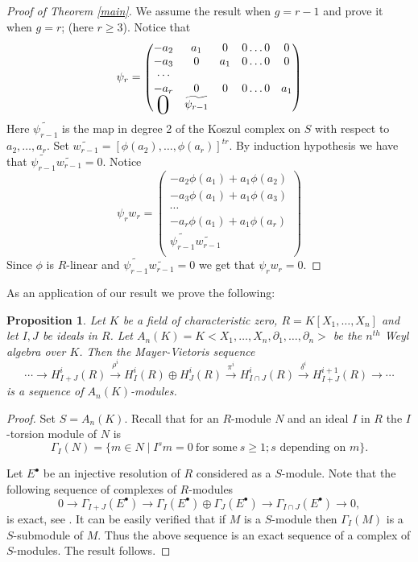 \documentclass{amsart}
\theoremstyle{plain}
\newtheorem{proposition}[theorem]{Proposition}
\theoremstyle{definition}
\theoremstyle{remark}
\numberwithin{equation}{theorem}
\begin{document}
\begin{proof}[Proof of Theorem \ref{main}]
We assume the result when $g = r-1$ and prove it when $g = r$; (here $r \geq 3$).
Notice that
\[
\psi_{r} = \left(
\begin{matrix}
-a_2&a_1&0 &0\ldots 0  &0\\
-a_3&0 &a_1 &0 \ldots 0 &0\\
\cdots \\
-a_r&0 &0 &0 \ldots 0 &a_1 \\
{{\parbox{12pt}{\Huge {0}}}} &\widetilde{\psi_{r-1}} \\
\end{matrix}
\right)
\]
Here $\widetilde{\psi_{r-1}}$ is the map in degree 2 of the Koszul complex on $S$ {with respect to} \ $a_2,\ldots, a_r$. Set
$\widetilde{w_{r-1}} = [\phi(a_2),\ldots,\phi(a_r)]^{tr}$. By induction hypothesis we have that $\widetilde{\psi_{r-1}}
\widetilde{w_{r-1}} = 0$. Notice
\[
\psi_rw_r = \left(
\begin{matrix}
-a_2\phi(a_1) + a_1\phi(a_2)\\
-a_3\phi(a_1) + a_1\phi(a_3) \\
\cdots \\
-a_r\phi(a_1) +a_1\phi(a_r) \\
\widetilde{\psi_{r-1}}\widetilde{w_{r-1}} \\
\end{matrix}
\right)
\]
Since $\phi$ is $R$-linear and $\widetilde{\psi_{r-1}}\widetilde{w_{r-1}} = 0$ we get that $\psi_r w_r = 0$.
\end{proof}
As an application of our result we prove the following:
\begin{proposition}\label{app}
Let $K$ be a field of characteristic zero, $R = K[X_1,\ldots,X_n]$ and let $I, J$ be  ideals in $R$. Let $A_n(K) = K<X_1,\ldots,X_n, \partial_1, \ldots, \partial_n>$  be the $n^{th}$ Weyl algebra over $K$. Then the  Mayer-Vietoris sequence
\[
\cdots {\rightarrow} H^{i}_{I+J}(R) \xrightarrow{\rho^i} H^i_I(R) \oplus H^i_J(R) \xrightarrow{\pi^i} H^i_{I\cap J}(R) \xrightarrow{\delta^i} H^{i+1}_{I+J}(R) {\rightarrow} \cdots
\]
is a sequence of $A_n(K)$-modules.
\end{proposition}
\begin{proof}
Set $S = A_n(K)$.
Recall that for an $R$-module $N$ and an ideal $I$ in $R$ the $I$-torsion module of $N$ is
\[
\Gamma_I(N) = \{ m \in N \mid I^sm = 0 \ \text{for some} \ s \geq 1; \text{$s$ depending on $m$} \}.
\]

Let $E^{\bullet}$ be an injective resolution of $R$ considered as a $S$-module. Note that the following sequence  of complexes of $R$-modules
\[
0 \rightarrow \Gamma_{I+J}(E^{\bullet})  \rightarrow \Gamma_{I}(E^{\bullet}) \oplus \Gamma_{J}(E^{\bullet})   \rightarrow \Gamma_{I\cap J}(E^{\bullet}) \rightarrow 0,
\]
 is exact, see \cite[page 154]{a7}.
It can be easily verified that if $M$ is a $S$-module then $\Gamma_I(M)$ is a $S$-submodule of $M$. Thus the above sequence is an exact sequence
of a complex of $S$-modules. The result follows.
\end{proof}
\end{document}

